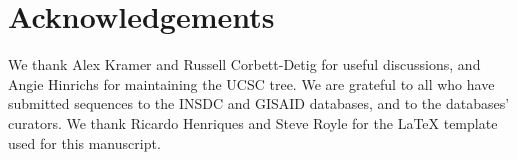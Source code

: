 \section*{Acknowledgements}
We thank Alex Kramer and Russell Corbett-Detig for useful discussions, and Angie Hinrichs for maintaining the UCSC tree.  We are grateful to all who have submitted sequences to the INSDC and GISAID databases, and to the databases' curators. We thank Ricardo Henriques and Steve Royle for the LaTeX template used for this manuscript.